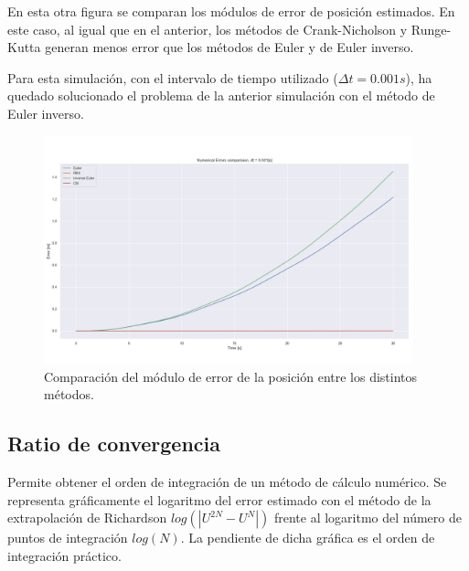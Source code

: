 \documentclass[12pt,a4paper]{article}
\begin{document}
En esta otra figura se comparan los módulos de error de posición estimados. En este caso, al igual que en el anterior, los métodos de Crank-Nicholson y Runge-Kutta generan menos error que los métodos de Euler y de Euler inverso. 

Para esta simulación, con el intervalo de tiempo utilizado ($\Delta t = 0.001 s$), ha quedado solucionado el problema de la anterior simulación con el método de Euler inverso. 
\begin{figure}[H] 
	\centering
	\includegraphics[width=0.95\textwidth]{FIGURES/dt0.001_error_comparison.png}
	\caption{Comparación del módulo de error de la posición entre los distintos métodos.}
\end{figure}

\subsection{Ratio de convergencia}
Permite obtener el orden de integración de un método de cálculo numérico. Se representa gráficamente el logaritmo del error estimado con el método de la extrapolación de Richardson $log(|U^{2N} - U^{N}|)$ frente al logaritmo del número de puntos de integración $log(N)$. La pendiente de dicha gráfica es el orden de integración práctico.
\end{document}
